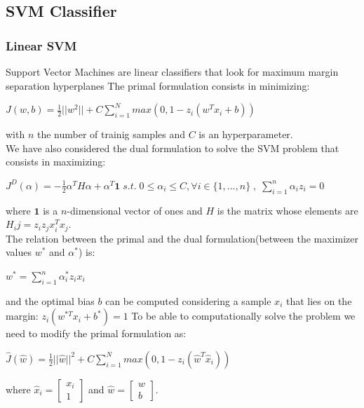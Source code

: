 \documentclass[10pt, a4paper, twocolumn]{article} %
\begin{document}
\subsection{SVM Classifier}
\subsubsection{Linear SVM}
Support Vector Machines are linear classifiers that look for maximum margin separation hyperplanes
The primal formulation consists in minimizing:
\begin{center}
	\begin{math}
		J(w,b)=\frac{1}{2}||w^2|| + C\sum_{i=1}^{N}max(0, 1-z_i(w^Tx_i+b))
	\end{math}
\end{center}
with $n$ the number of trainig samples and $C$ is an hyperparameter.\\
We have also considered the dual formulation to solve the SVM problem that consists in maximizing:
\begin{center}
	\begin{math}
		J^D(\alpha)=-\frac{1}{2}\alpha^TH\alpha + \alpha^T\textbf{1} \; s.t.\; 0 \le \alpha_i \le C, \forall i\in \{1,...,n\}\;,\;\sum_{i=1}^{n}\alpha_iz_i=0
	\end{math}
\end{center}
where $\textbf{1}$ is a $n$-dimensional vector of ones and $H$ is the matrix
whose elements are $H_ij = z_iz_jx_i^Tx_j$.\\
The relation between the primal and the dual formulation(between the maximizer values $w^*$ and $\alpha^*$) is:
\begin{center}
	$w^*=\sum_{i=1}^{n}\alpha_i^*z_ix_i$
\end{center}
and the optimal bias $b$ can be computed considering a sample $x_i$ that lies on the margin: $z_i(w^{*T}x_i+b^*)=1$
To be able to computationally solve the problem
we need to modify the primal formulation as:
\begin{center}
	\begin{math}
		\hat{J}(\hat{w})=\frac{1}{2}||\hat{w}||^2 + C\sum_{i=1}^{N}max(0, 1-z_i(\hat{w}^T\hat{x}_i))
	\end{math}
\end{center}
where $\hat{x}_i = \begin{bmatrix} x_i\\ 1 \end{bmatrix}$ and $\hat{w} = \begin{bmatrix} w\\ b \end{bmatrix}$.\\
\end{document}
